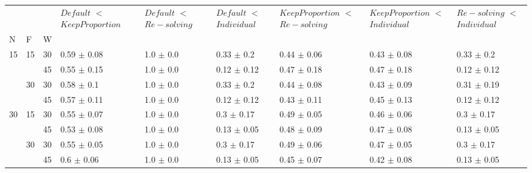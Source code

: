 \begin{tabular}{lllllllll}
\toprule
   &    &    & $Default$ $<$ $Keep Proportion$ & $Default$ $<$ $Re-solving$ & $Default$ $<$ $Individual$ & $Keep Proportion$ $<$ $Re-solving$ & $Keep Proportion$ $<$ $Individual$ & $Re-solving$ $<$ $Individual$ \\
N & F & W &                                 &                            &                            &                                    &                                    &                               \\
\midrule
15 & 15 & 30 &                 0.59 $\pm$ 0.08 &              1.0 $\pm$ 0.0 &             0.33 $\pm$ 0.2 &                    0.44 $\pm$ 0.06 &                    0.43 $\pm$ 0.08 &                0.33 $\pm$ 0.2 \\
   &    & 45 &                 0.55 $\pm$ 0.15 &              1.0 $\pm$ 0.0 &            0.12 $\pm$ 0.12 &                    0.47 $\pm$ 0.18 &                    0.47 $\pm$ 0.18 &               0.12 $\pm$ 0.12 \\
   & 30 & 30 &                  0.58 $\pm$ 0.1 &              1.0 $\pm$ 0.0 &             0.33 $\pm$ 0.2 &                    0.44 $\pm$ 0.08 &                    0.43 $\pm$ 0.09 &               0.31 $\pm$ 0.19 \\
   &    & 45 &                 0.57 $\pm$ 0.11 &              1.0 $\pm$ 0.0 &            0.12 $\pm$ 0.12 &                    0.43 $\pm$ 0.11 &                    0.45 $\pm$ 0.13 &               0.12 $\pm$ 0.12 \\
30 & 15 & 30 &                 0.55 $\pm$ 0.07 &              1.0 $\pm$ 0.0 &             0.3 $\pm$ 0.17 &                    0.49 $\pm$ 0.05 &                    0.46 $\pm$ 0.06 &                0.3 $\pm$ 0.17 \\
   &    & 45 &                 0.53 $\pm$ 0.08 &              1.0 $\pm$ 0.0 &            0.13 $\pm$ 0.05 &                    0.48 $\pm$ 0.09 &                    0.47 $\pm$ 0.08 &               0.13 $\pm$ 0.05 \\
   & 30 & 30 &                 0.55 $\pm$ 0.05 &              1.0 $\pm$ 0.0 &             0.3 $\pm$ 0.17 &                    0.49 $\pm$ 0.06 &                    0.47 $\pm$ 0.05 &                0.3 $\pm$ 0.17 \\
   &    & 45 &                  \cellcolor{red!25} 0.6 $\pm$ 0.06 &              1.0 $\pm$ 0.0 &            0.13 $\pm$ 0.05 &                    0.45 $\pm$ 0.07 &                    0.42 $\pm$ 0.08 &               0.13 $\pm$ 0.05 \\

\end{tabular}
